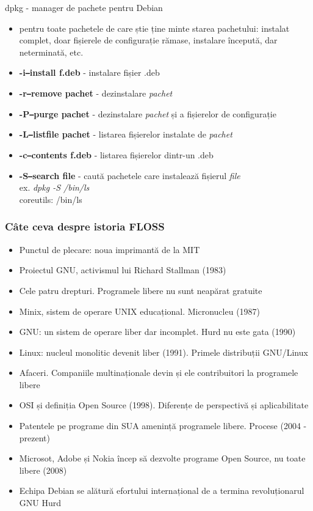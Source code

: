 \documentclass{beamer}
\begin{document}
\begin{frame}{dpkg - manager de pachete pentru Debian}
  \begin{itemize}
  \item pentru toate pachetele de care știe ține minte starea pachetului: 
    instalat complet, doar fișierele de configurație rămase, instalare începută,
    dar neterminată, etc.
  \item \textbf{-i\/\texttt{--}install f.deb} - instalare fișier .deb
  \item \textbf{-r\/\texttt{--}remove pachet} - dezinstalare \textit{pachet}
  \item \textbf{-P\/\texttt{--}purge pachet} - dezinstalare \textit{pachet} și a fișierelor de configurație
  \item \textbf{-L\/\texttt{--}listfile pachet} - listarea fișierelor instalate de \textit{pachet}
  \item \textbf{-c\/\texttt{--}contents f.deb} - listarea fișierelor dintr-un .deb
  \item \textbf{-S\/\texttt{--}search file} - caută pachetele care instalează fișierul \textit{file} \\
    ex. \textit{dpkg -S /bin/ls} \\
    coreutils: /bin/ls
  \end{itemize}
\end{frame}



\begin{frame}[allowframebreaks] %
  \frametitle{Câte ceva despre istoria FLOSS}
  \begin{itemize}
  \item Punctul de plecare: noua imprimantă de la MIT
  \item Proiectul GNU, activismul lui Richard Stallman (1983)
  \item Cele patru drepturi. Programele libere nu sunt neapărat gratuite
  \item Minix, sistem de operare UNIX educațional. Micronucleu (1987)
  \item GNU: un sistem de operare liber dar incomplet. Hurd nu este gata (1990)
  \item Linux: nucleul monolitic devenit liber (1991). Primele distribuții
    GNU/Linux
  \item Afaceri. Companiile multinaționale devin și ele contribuitori la
    programele libere
  \item OSI și definiția Open Source (1998). Diferențe de perspectivă și
    aplicabilitate
  \item Patentele pe programe din SUA amenință programele libere. Procese (2004
    - prezent)
  \item Microsot, Adobe și Nokia încep să dezvolte programe Open Source, nu
    toate libere (2008)
  \item Echipa Debian se alătură efortului internațional de a termina
    revoluționarul GNU Hurd
  \end{itemize}
\end{frame}
\end{document}
